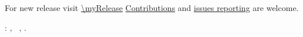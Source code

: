 \clearpage
{}
\thispagestyle{empty}

\hfill

\vfill

For new release visit \url{\myRelease}
\href{\myPullRequest}{Contributions} and \href{\myIssue}{issues
reporting} are welcome.

\vspace{5px}

\noindent\myName: \textit{\myTitle,}
\textcopyright\ \myCopyright, \the\year.
